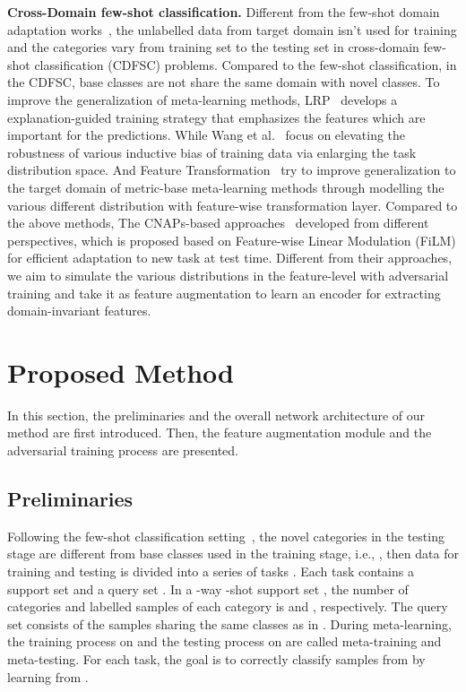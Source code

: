\documentclass[runningheads]{utils/llncs}
\begin{document}
{\noindent \bf Cross-Domain few-shot classification.}
Different from the few-shot domain adaptation works~\cite{SaitoKSDS19,YueZZ0DKS21}, the unlabelled data from target domain isn't used for training and the categories vary from training set to the testing set in cross-domain few-shot classification (CDFSC) problems. Compared to the few-shot classification, in the CDFSC, base classes are not share the same domain with novel classes. To improve the generalization of meta-learning methods, LRP~\cite{SunLSZCB20} develops a explanation-guided training strategy that emphasizes the features which are important for the predictions. While Wang et al.~\cite{WangD21} focus on elevating the robustness of various inductive bias of training data via enlarging the task distribution space. And Feature Transformation~\cite{TsengLH020} try to improve generalization to the target domain of metric-base meta-learning methods through modelling the various different distribution with feature-wise transformation layer.
Compared to the above methods, The CNAPs-based approaches~\cite{Requeima0BNT19,BateniBMW22,Bronskill0RNT20,BronskillMPHNT21,BateniGMWS20} developed from different perspectives, which is proposed based on Feature-wise Linear Modulation (FiLM) for efficient adaptation to new task at test time. 
Different from their approaches, we aim to simulate the various distributions in the feature-level with adversarial training and take it as feature augmentation to learn an encoder for extracting domain-invariant features.

%
 \section{Proposed Method}
In this section, the preliminaries and the overall network architecture of our method are first introduced.
Then, the feature augmentation module and the adversarial training process are presented. 

\subsection{Preliminaries}
Following the few-shot classification setting~\cite{RaviL17}, the novel categories in the testing stage  are different from base classes  used in the training stage, i.e., , then data for training and testing is divided into a series of tasks . 
Each task contains a support set  and a query set . 
In a -way -shot support set , the number of categories and labelled samples of each category is  and , respectively. 
The query set  consists of the samples sharing the same classes as in . 
During meta-learning, the training process on  and the testing process on  are called meta-training and meta-testing.
For each task, the goal is to correctly classify samples from  by learning from . 
\end{document}
